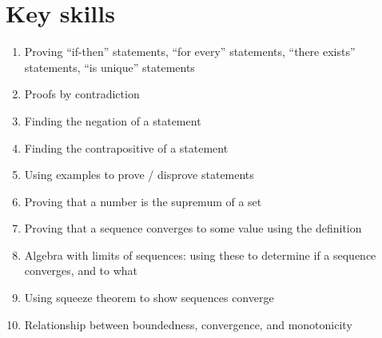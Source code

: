 \documentclass[12pt]{amsart}
\newcommand{\e}{\varepsilon}
\renewcommand{\d}{\delta}
\begin{document}
\section*{Key skills}

\begin{enumerate}
	\item Proving ``if-then'' statements, ``for every'' statements, ``there exists'' statements, ``is unique'' statements
	\item Proofs by contradiction
	\item Finding the negation of a statement
	\item Finding the contrapositive of a statement
	\item Using examples to prove / disprove statements

	\item Proving that a number is the supremum of a set

	\item Proving that a sequence converges to some value using the definition

		\item Algebra with limits of sequences: using these to determine if a sequence converges, and to what

	\item Using squeeze theorem to show sequences converge


	\item Relationship between boundedness, convergence, and monotonicity
					\begin{comment}
		\item Proofs by induction

	\item Relationship between convergence/boundedness of sequences and convergence of subsequences
	\item Using the Cauchy property to show a sequence converges

	\item Using the $\e-\d$ definition to compute limits
						
	\item Using algebra/squeeze theorem to compute limits

	\item Using the $\e-\d$ definition to show continuity

	\item Using algebra/compositions to show continuity
	\item Applying the $\e-\d$ definitions of limits and continuity 
			\item Applying the Intermediate Value Theorem
		\item Applying Boundedness and Extreme Value Theorems
		


\end{comment}
\end{enumerate}
\end{document}
